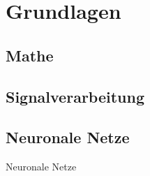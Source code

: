 %
% 
%

\chapter{Grundlagen}

\section{Mathe}

\section{Signalverarbeitung}

\section{Neuronale Netze}
Neuronale Netze



%
%
